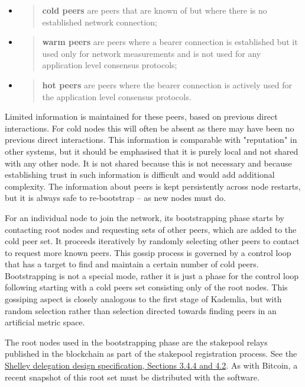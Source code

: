 \documentclass[]{article}
\begin{document}
\begin{itemize}
\item
  \begin{quote}
  \textbf{cold peers} are peers that are known of but where there is no
  established network connection;
  \end{quote}
\item
  \begin{quote}
  \textbf{warm peers} are peers where a bearer connection is established
  but it used only for network measurements and is not used for any
  application level consensus protocols;
  \end{quote}
\item
  \begin{quote}
  \textbf{hot peers} are peers where the bearer connection is actively
  used for the application level consensus protocols.
  \end{quote}
\end{itemize}

Limited information is maintained for these peers, based on previous
direct interactions. For cold nodes this will often be absent as there
may have been no previous direct interactions. This information is
comparable with "reputation" in other systems, but it should be
emphasised that it is purely local and not shared with any other node.
It is not shared because this is not necessary and because establishing
trust in such information is difficult and would add additional
complexity. The information about peers is kept persistently across node
restarts, but it is always safe to re-bootstrap -- as new nodes must do.

For an individual node to join the network, its bootstrapping phase
starts by contacting root nodes and requesting sets of other peers,
which are added to the cold peer set. It proceeds iteratively by
randomly selecting other peers to contact to request more known peers.
This gossip process is governed by a control loop that has a target to
find and maintain a certain number of cold peers. Bootstrapping is not a
special mode, rather it is just a phase for the control loop following
starting with a cold peers set consisting only of the root nodes. This
gossiping aspect is closely analogous to the first stage of Kademlia,
but with random selection rather than selection directed towards finding
peers in an artificial metric space.

The root nodes used in the bootstrapping phase are the stakepool relays
published in the blockchain as part of the stakepool registration
process. See the
\href{https://hydra.iohk.io/job/Cardano/cardano-ledger-specs/delegationDesignSpec/latest/download-by-type/doc-pdf/delegation_design_spec}{{Shelley
delegation design specification, Sections 3.4.4 and 4.2}}. As with
Bitcoin, a recent snapshot of this root set must be distributed with the
software.
\end{document}
